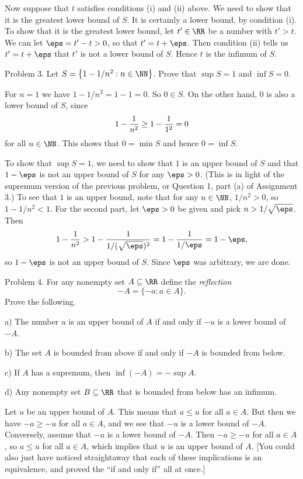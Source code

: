 Now suppose that $t$ satisfies conditions (i) and (ii) above. We need to show that it is the
greatest lower bound of $S$. It is certainly a lower bound, by condition (i). To show that it is
the greatest lower bound, let $t'\in \RR$ be a number with $t' > t$. We can let $\eps = t'-t > 0$, so
that $t' = t + \eps$. Then condition (ii) tells us $t' = t+ \eps$ that $t'$ is not a lower bound
of $S$. Hence $t$ is the infimum of $S$.\slug

\proclaim Problem 3. Let $S = \bigl\{ 1 - 1/n^2 : n\in \NN\bigr\}$. Prove that $\sup S = 1$
and $\inf S = 0$.

\proof For $n = 1$ we have $1 - 1/n^2 = 1-1 = 0$. So $0\in S$. On the other hand, $0$
is also a lower bound of $S$, since
$$ 1 - {1\over n^2} \ge 1-{1\over 1^2} = 0 $$
for all $n\in \NN$. This shows that $0=\min S$ and hence $0 = \inf S$.

To show that $\sup S = 1$, we need to show that $1$ is an upper bound of $S$ and that $1-\eps$
is not an upper bound of $S$ for any $\eps > 0$. (This is in light of the supremum version
of the previous problem, or Question 1, part (a) of Assignment 3.) To see that $1$ is an upper bound,
note that for any $n\in \NN$, $1/n^2 > 0$, so $1-1/n^2 < 1$. For the second part, let $\eps > 0$ be
given and pick $n>1/\sqrt\eps$. Then
$$ 1- {1\over n^2} > 1 - {1\over 1/(\sqrt\eps)^2} = 1-{1\over 1/\eps} = 1-\eps,$$
so $1-\eps$ is not an upper bound of $S$. Since $\eps$ was arbitrary, we are done.\slug

\proclaim Problem 4. For any nonempty set $A\subseteq \RR$ define the {\it reflection}
$$ -A = \{ - a : a\in A \}.$$
Prove the following.
\medskip
\item{a)} The number $u$ is an upper bound of $A$ if and only if $-u$ is a lower bound of $-A$.
\smallskip
\item{b)} The set $A$ is bounded from above if and only if $-A$ is bounded from below.
\smallskip
\item{c)} If $A$ has a supremum, then $\inf(-A) = -\sup A$.
\smallskip
\item{d)} Any nonempty set $B\subseteq \RR$ that is bounded from below has an infimum.
\medskip

\proof Let $u$ be an upper bound of $A$. This means that $a\le u$ for all $a\in A$. But then
we have $-a \ge -u$ for all $a\in A$, and we see that $-u$ is a lower bound of $-A$. Conversely,
assume that $-u$ is a lower bound of $-A$. Then $-a \ge -u$ for all $a\in A$, so $a\le u$
for all $a\in A$, which implies that $u$ is an upper bound of $A$. [You could also just have
noticed straightaway that each of these implications is an equivalence, and proved the ``if and only if''
all at once.]

